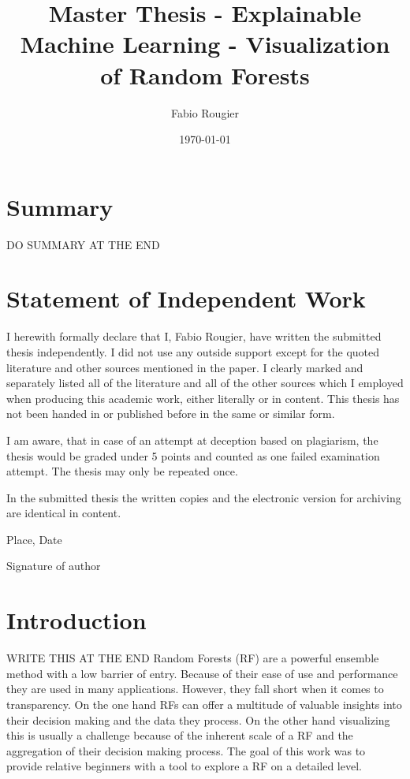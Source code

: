 \documentclass[a4paper, 12pt]{article}
\title{Master Thesis - Explainable Machine Learning - Visualization of Random Forests}
\author{Fabio Rougier}
\date{\today}
\begin{document}
\maketitle

\clearpage
\section{Summary}
DO SUMMARY AT THE END

\tableofcontents

\clearpage
\section{Statement of Independent Work}
I herewith formally declare that I, Fabio Rougier, have written the submitted thesis independently.
I did not use any outside support except for the quoted literature and other sources mentioned in the paper.
I clearly marked and separately listed all of the literature and all of the other sources which I employed when
producing this academic work, either literally or in content. This thesis has not been handed in or published before
in the same or similar form.
\par
I am aware, that in case of an attempt at deception based on plagiarism, the thesis would be graded under 5 points
and counted as one failed examination attempt. The thesis may only be repeated once.
\par
In the submitted thesis the written copies and the electronic version for archiving are identical in content.
\vspace{40pt}

\noindent
Place, Date
\vspace{60pt}

\noindent
Signature of author

\clearpage
\section{Introduction}
WRITE THIS AT THE END
Random Forests (RF) \cite{breiman2001random} are a powerful ensemble method with a low barrier of entry. Because of their
ease of use and performance they are used in many applications. However, they fall short
when it comes to transparency.
On the one hand RFs can offer a multitude of valuable insights into their decision making and the data they
process. On the other hand visualizing this is usually a challenge because of the inherent scale of a RF and the
aggregation of their decision making process. The goal of this work was to provide relative
beginners with a tool to explore a RF on a detailed level.
\end{document}
